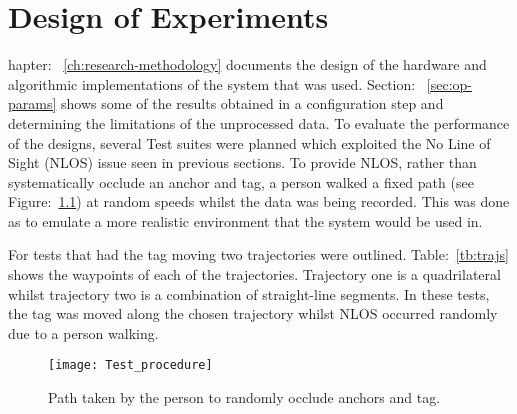 \chapter{Design of Experiments}\label{ch:design-experiments}
hapter: ~\ref{ch:research-methodology} documents the design of the hardware and algorithmic implementations of the system that was used.
Section: ~\ref{sec:op-params} shows some of the results obtained in a configuration step and determining the limitations of the unprocessed data.
To evaluate the performance of the designs, several Test suites were planned which exploited the No Line of Sight (NLOS) issue seen in previous sections.
To provide NLOS, rather than systematically occlude an anchor and tag, a person walked a fixed path (see Figure:~\ref{fig:occlude}) at random speeds whilst the data was being recorded.
This was done as to emulate a more realistic environment that the system would be used in.

For tests that had the tag moving two trajectories were outlined.
Table:~\ref{tb:trajs} shows the waypoints of each of the trajectories.
Trajectory one is a quadrilateral whilst trajectory two is a combination of straight-line segments.
In these tests, the tag was moved along the chosen trajectory whilst NLOS occurred randomly due to a person walking.

\begin{figure}[ht!]
    \centering
    \texttt{[image: Test\_procedure]}
    \caption{Path taken by the person to randomly occlude anchors and tag.}
    \label{fig:occlude}
\end{figure}

